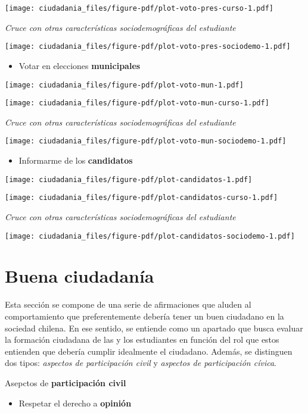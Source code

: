 \documentclass[
  letterpaper,
  DIV=11,
  numbers=noendperiod]{scrreprt}
\providecommand{\tightlist}{%
  \setlength{\itemsep}{0pt}\setlength{\parskip}{0pt}}\usepackage{longtable,booktabs,array}
\begin{document}
\texttt{[image: ciudadania\_files/figure-pdf/plot-voto-pres-curso-1.pdf]}

\emph{Cruce con otras características sociodemográficas del estudiante}

\texttt{[image: ciudadania\_files/figure-pdf/plot-voto-pres-sociodemo-1.pdf]}

\begin{itemize}
\tightlist
\item
  Votar en elecciones \textbf{municipales}
\end{itemize}

\texttt{[image: ciudadania\_files/figure-pdf/plot-voto-mun-1.pdf]}

\texttt{[image: ciudadania\_files/figure-pdf/plot-voto-mun-curso-1.pdf]}

\emph{Cruce con otras características sociodemográficas del estudiante}

\texttt{[image: ciudadania\_files/figure-pdf/plot-voto-mun-sociodemo-1.pdf]}

\begin{itemize}
\tightlist
\item
  Informarme de los \textbf{candidatos}
\end{itemize}

\texttt{[image: ciudadania\_files/figure-pdf/plot-candidatos-1.pdf]}

\texttt{[image: ciudadania\_files/figure-pdf/plot-candidatos-curso-1.pdf]}

\emph{Cruce con otras características sociodemográficas del estudiante}

\texttt{[image: ciudadania\_files/figure-pdf/plot-candidatos-sociodemo-1.pdf]}

\section{Buena ciudadanía}\label{buena-ciudadanuxeda}

Esta sección se compone de una serie de afirmaciones que aluden al
comportamiento que preferentemente debería tener un buen ciudadano en la
sociedad chilena. En ese sentido, se entiende como un apartado que busca
evaluar la formación ciudadana de las y los estudiantes en función del
rol que estos entienden que debería cumplir idealmente el ciudadano.
Además, se distinguen dos tipos: \emph{aspectos de participación civil}
y \emph{aspectos de participación cívica}.

Asepctos de \textbf{participación civil}

\begin{itemize}
\tightlist
\item
  Respetar el derecho a \textbf{opinión}
\end{itemize}
\end{document}

